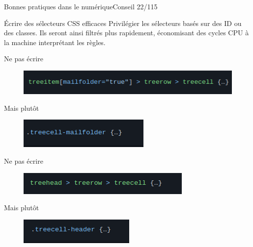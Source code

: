 \begin{frame}{Bonnes pratiques dans le numérique}{Conseil 22/115}

\begin{block}{Écrire des sélecteurs CSS efficaces}
Privilégier les sélecteurs basés sur des ID ou des classes. Ils seront ainsi filtrés plus rapidement, économisant des cycles CPU à la machine interprétant les règles.
 \end{block}

\begin{minipage}[b]{0.7\linewidth}
\begin{alertblock}{Ne pas écrire}
\begin{figure}
    \includegraphics[scale=0.4]{chapitre2/wdd3/fig/c1.png}
    \centering
\end{figure}
 \end{alertblock}
\end{minipage}\hfill
\begin{minipage}[b]{0.3\linewidth}
\begin{exampleblock}{Mais plutôt}
\begin{figure}
    \includegraphics[scale=0.4]{chapitre2/wdd3/fig/c2.png}
    \centering
\end{figure}
 \end{exampleblock}
\end{minipage}\hfill

\begin{minipage}[b]{0.7\linewidth}
\begin{alertblock}{Ne pas écrire}
\begin{figure}
    \includegraphics[scale=0.5]{chapitre2/wdd3/fig/c3.png}
    \centering
\end{figure}
 \end{alertblock}
\end{minipage}\hfill
\begin{minipage}[b]{0.3\linewidth}
\begin{exampleblock}{Mais plutôt}
\begin{figure}
    \includegraphics[scale=0.4]{chapitre2/wdd3/fig/c4.png}
    \centering
\end{figure}
 \end{exampleblock}
\end{minipage}\hfill


\end{frame}



